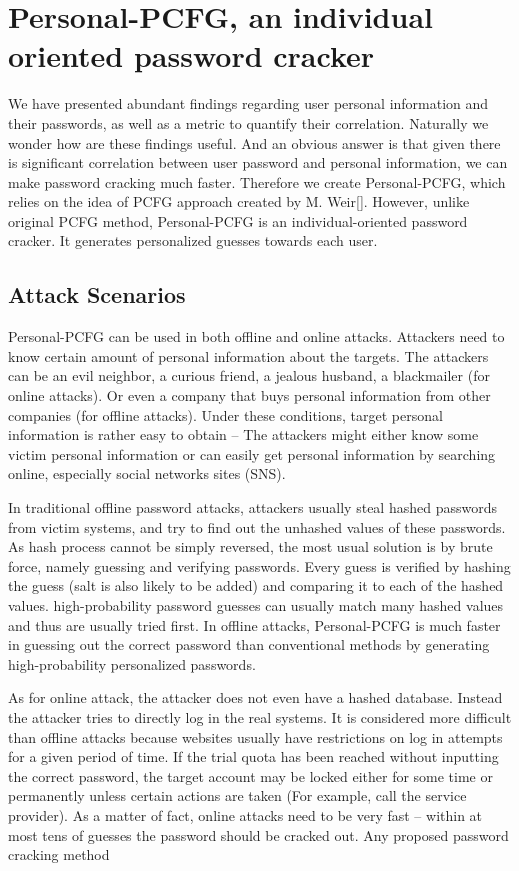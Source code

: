 \documentclass{sig-alternate}
\begin{document}
\section{Personal-PCFG, an individual oriented password cracker}
We have presented abundant findings regarding user personal information and their passwords, as well as a metric to quantify their correlation. Naturally we wonder how are these findings useful. And an obvious answer is that given there is significant correlation between user password and personal information, we can make password cracking much faster. Therefore we create Personal-PCFG, which relies on the idea of PCFG approach created by M. Weir[]. However, unlike original PCFG method, Personal-PCFG is an individual-oriented password cracker. It generates personalized guesses towards each user.

\subsection{Attack Scenarios}
Personal-PCFG can be used in both offline and online attacks. Attackers need to know certain amount of personal information about the targets. The attackers can be an evil neighbor, a curious friend, a jealous husband, a blackmailer (for online attacks). Or even a company that buys personal information from other companies (for offline attacks). Under these conditions, target personal information is rather easy to obtain -- The attackers might either know some victim personal information or can easily get personal information by searching online, especially social networks sites (SNS). 

In traditional offline password attacks, attackers usually steal hashed passwords from victim systems, and try to find out the unhashed values of these passwords. As hash process cannot be simply reversed, the most usual solution is by brute force, namely guessing and verifying passwords. Every guess is verified by hashing the guess (salt is also likely to be added) and comparing it to each of the hashed values. high-probability password guesses can usually match many hashed values and thus are usually tried first. In offline attacks, Personal-PCFG is much faster in guessing out the correct password than conventional methods by generating high-probability personalized passwords.

As for online attack, the attacker does not even have a hashed database. Instead the attacker tries to directly log in the real systems. It is considered more difficult than offline attacks because websites usually have restrictions on log in attempts for a given period of time. If the trial quota has been reached without inputting the correct password, the target account may be locked either for some time or permanently unless certain actions are taken (For example, call the service provider). As a matter of fact, online attacks need to be very fast -- within at most tens of guesses the password should be cracked out. Any proposed password cracking method 
\end{document}
